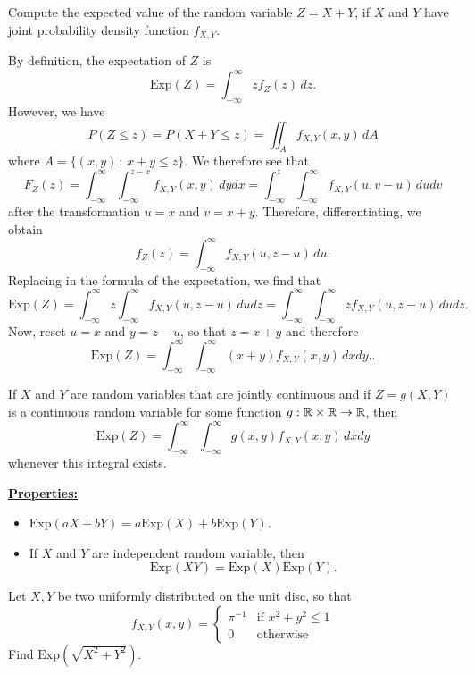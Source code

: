 \begin{example}
Compute the expected value of the random variable $Z = X + Y$, if $X$ and $Y$ have joint probability density function $f_{X, Y}$.
\end{example}

\begin{sol*}
By definition, the expectation of $Z$ is
    \[
        \mathrm{Exp} (Z) = \int_{-\infty}^\infty z f_Z (z) \, dz .
    \]
However, we have
    \[
        P (Z \leq z ) = P (X + Y \leq z) = \iint_A f_{X, Y} (x, y) \, dA
    \]
where $A = \{ (x, y) \, : \, x + y \leq z \}$. We therefore see that
    \[
        F_Z (z) = \int_{-\infty}^\infty \int_{-\infty}^{z - x} f_{X, Y} (x, y) \, dy dx = \int_{-\infty}^z \int_{-\infty}^\infty f_{X, Y} (u, v-u) \, du dv
    \]
after the transformation $u = x$ and $v = x + y$. Therefore, differentiating, we obtain
    \[
        f_Z (z) = \int_{-\infty}^\infty f_{X, Y} (u, z - u ) \, du .
    \]
Replacing in the formula of the expectation, we find that
    \[
        \mathrm{Exp} (Z) = \int_{-\infty}^\infty z \int_{-\infty}^\infty f_{X, Y} (u, z - u) \, du dz = \int_{-\infty}^\infty \int_{-\infty}^\infty z f_{X, Y} (u, z - u ) \, du dz . 
    \]
Now, reset $u = x$ and $y = z - u$, so that $z = x + y$ and therefore
    \[
        \mathrm{Exp} (Z) = \int_{-\infty}^\infty \int_{-\infty}^\infty (x + y) f_{X, Y} (x, y) \, dx dy . \tag*{$\triangle$} .
    \]
\end{sol*}

\begin{theorem}
If $X$ and $Y$ are random variables that are jointly continuous and if $Z = g (X, Y)$ is a continuous random variable for some function $g : \mathbb{R} \times \mathbb{R} \rightarrow \mathbb{R}$, then
    \[
        \mathrm{Exp} (Z) = \int_{-\infty}^\infty \int_{-\infty}^\infty g (x, y) f_{X, Y} (x, y) \, dx dy 
    \]
whenever this integral exists.
\end{theorem}

\underline{\textbf{Properties:}}
    \begin{itemize}
        \item $\mathrm{Exp} (a X + bY) = a \mathrm{Exp} (X) + b \mathrm{Exp} (Y)$.
        \item If $X$ and $Y$ are independent random variable, then
            \[
                \mathrm{Exp} (X Y) = \mathrm{Exp} (X) \mathrm{Exp} (Y) .
            \]
    \end{itemize}

\begin{example}
Let $X, Y$ be two uniformly distributed on the unit disc, so that
    \[
        f_{X, Y} (x, y) = \left\lbrace \begin{matrix} \pi^{-1} & \text{if } x^2 + y^2 \leq 1 \\
        0 & \text{otherwise} \end{matrix} \right.
    \]
Find $\mathrm{Exp} (\sqrt{X^2 + Y^2})$.
\end{example}

